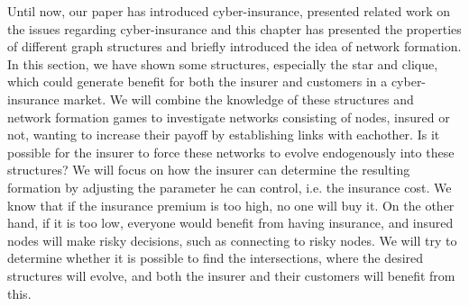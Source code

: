 Until now, our paper has introduced cyber-insurance, presented related work on the issues regarding cyber-insurance and this chapter has presented the properties of different graph structures and briefly introduced the idea of network formation. 
In this section, we have shown some structures, especially the star and clique, which could generate benefit for both the insurer and customers in a cyber-insurance market. 
We will combine the knowledge of these structures and network formation games to investigate networks consisting of nodes, insured or not, wanting to increase their payoff by establishing links with eachother. Is it possible for the insurer to force these networks to evolve endogenously into these structures?
We will focus on how the insurer can determine the resulting formation by adjusting the parameter he can control, i.e. the insurance cost. We know that if the insurance premium is too high, no one will buy it. On the other hand, if it is too low, everyone would benefit from having insurance, and insured nodes will make risky decisions, such as connecting to risky nodes. We will try to determine whether it is possible to find the intersections, where the desired structures will evolve, and both the insurer and their customers will benefit from this.
